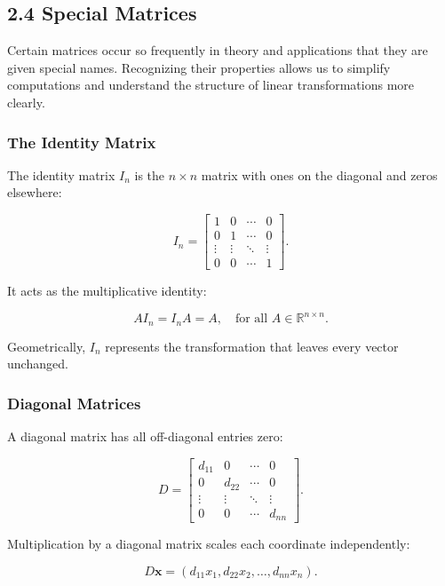 \documentclass[
  12pt,
  a4paper,
]{article}
\begin{document}
\subsection{2.4 Special Matrices}\label{24-special-matrices}

Certain matrices occur so frequently in theory and applications that
they are given special names. Recognizing their properties allows us to
simplify computations and understand the structure of linear
transformations more clearly.

\subsubsection{The Identity Matrix}\label{the-identity-matrix}

The identity matrix \(I_n\) is the \(n \times n\) matrix with ones on
the diagonal and zeros elsewhere:

\[I_n = \begin{bmatrix}
1 & 0 & \cdots & 0 \\
0 & 1 & \cdots & 0 \\
\vdots & \vdots & \ddots & \vdots \\
0 & 0 & \cdots & 1
\end{bmatrix}.\]

It acts as the multiplicative identity:

\[AI_n = I_nA = A, \quad \text{for all } A \in \mathbb{R}^{n \times n}.\]

Geometrically, \(I_n\) represents the transformation that leaves every
vector unchanged.

\subsubsection{Diagonal Matrices}\label{diagonal-matrices}

A diagonal matrix has all off-diagonal entries zero:

\[D = \begin{bmatrix}
d_{11} & 0 & \cdots & 0 \\
0 & d_{22} & \cdots & 0 \\
\vdots & \vdots & \ddots & \vdots \\
0 & 0 & \cdots & d_{nn}
\end{bmatrix}.\]

Multiplication by a diagonal matrix scales each coordinate
independently:

\[D\mathbf{x} = (d_{11}x_1, d_{22}x_2, \dots, d_{nn}x_n).\]
\end{document}
